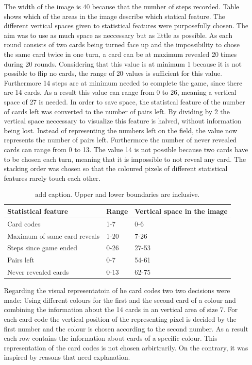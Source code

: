 The width of the image is 40 because that the number of steps recorded. Table  shows which of the areas in the image describe which statical feature. The different vertical spaces given to statistical features were purposefully chosen. The aim was to use as much space as neccessary but as little as possible. As each round consists of two cards being turned face up and the impossibility to chose the same card twice in one turn, a card can be at maximum revealed 20 times during 20 rounds. Considering that this value is at minimum 1 because it is not possible to flip no cards, the range of 20 values is sufficient for this value. Furthermore 14 steps are at minimum needed to complete the game, since there are 14 cards. As a result this value can range from 0 to 26, meaning a vertical space of 27 is needed. In order to save space, the statistcal feature of the number of cards left was converted to the number of pairs left. By dividing by 2 the vertical space neccessary to visualize this feature is halved, without information being lost. Instead of representing the numbers left on the field, the value now represents the number of pairs left. Furthermore the number of never revealed cards can range from 0 to 13. The value 14 is not possible because two cards have to be chosen each turn, meaning that it is impossible to not reveal any card. The stacking order was chosen so that the coloured pixels of different statistical features rarely touch each other. 
\begin{table}[H]
	\centering
	\caption{add caption. Upper and lower boundaries are inclusive.}%
	\label{tab:card_areas}
	\begin{tabular}{|l|l|l|}
		\hline
		Statistical feature & Range & Vertical space in the image \\
		\hline
		Card codes & 1-7 & 0-6 \\
		Maximum of same card reveals & 1-20 & 7-26 \\
		Steps since game ended & 0-26 & 27-53 \\
		Pairs left & 0-7 & 54-61\\
		Never revealed cards & 0-13 & 62-75 \\
		\hline
	\end{tabular}
\end{table}

Regarding the visual representatoin of he card codes two two decisions were made: Using different colours for the first and the second card of a colour and combining the information about the 14 cards in an vertical area of size 7. For each card code the vertical position of the representing pixel is decided by the first number and the colour is chosen according to the second number. As a result each row contains the information about cards of a specific colour. This representation of the card codes is not chosen arbirtrarily. On the contrary, it was inspired by reasons that need explanation.

